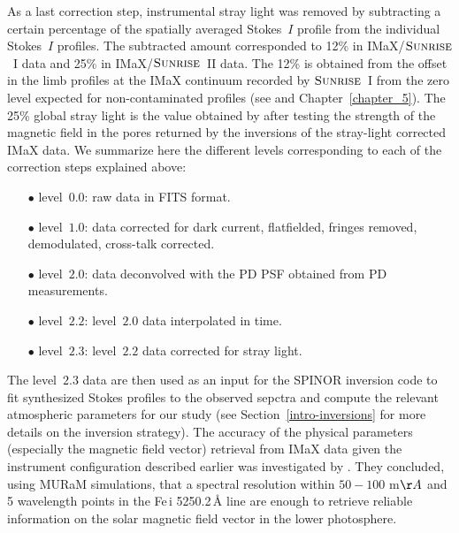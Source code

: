 \documentclass[goettingen, gauss, print]{thesis}
\begin{document}
As a last correction step, instrumental stray light was removed by subtracting a certain percentage of the spatially averaged Stokes~$I$ profile from the individual Stokes~$I$ profiles. The subtracted amount corresponded to 12\% in IMaX/$\textsc{Sunrise}$~I data and 25\% in IMaX/$\textsc{Sunrise}$~II data.
The 12\% is obtained from the offset in the limb profiles at the IMaX continuum recorded by $\textsc{Sunrise}$~I from the zero level expected for non-contaminated profiles (see \cite{kahil_brightness_2017} and Chapter~\ref{chapter_5}). The 25\% global stray light is the value obtained by \cite{riethmuller_new_2017} after testing the strength of the magnetic field in the pores returned by the inversions of the stray-light corrected IMaX data. We summarize here the different levels corresponding to each of the correction steps explained above:
\begin{enumerate}

\item[$\bullet$] level~$0.0$: raw data in FITS format.
\item[$\bullet$] level~$1.0$: data corrected for dark current, flatfielded, fringes removed, demodulated, cross-talk corrected.
\item[$\bullet$] level~$2.0$: data deconvolved with the PD PSF obtained from PD measurements.
\item[$\bullet$] level~$2.2$:  level~$2.0$ data interpolated in time.
\item[$\bullet$] level~$2.3$: level~$2.2$ data corrected for stray light.
\end{enumerate}

The level~$2.3$ data are then used as an input for the SPINOR inversion code to fit synthesized Stokes profiles to the observed sepctra and compute the relevant atmospheric parameters for our study (see Section~\ref{intro-inversions} for more details on the inversion strategy).  
The accuracy of the physical parameters (especially the magnetic field vector) retrieval from IMaX data given the instrument configuration described earlier was investigated by \cite{orozco_suarez_retrieval_2010}. They concluded, using MURaM simulations, that a spectral resolution within $50-100$ m$\AA$ and 5 wavelength points in the Fe\,{\sc i} 5250.2\,\AA{} line are enough to retrieve reliable information on the solar magnetic field vector in the lower photosphere.
\end{document}
